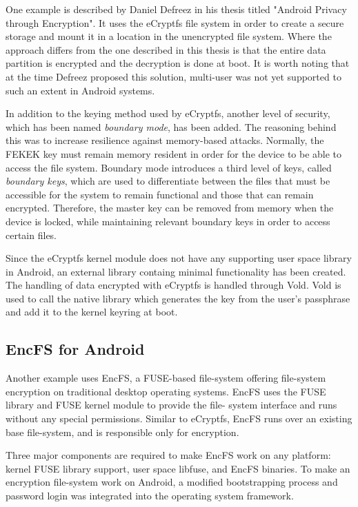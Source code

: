 One example is described by Daniel Defreez in his thesis titled "Android Privacy through Encryption".\cite{defreez}
It uses the eCryptfs file system in order to create a secure storage and mount it in a location in the unencrypted file system. Where the approach differs from the one described in this thesis is that the entire data partition is encrypted and the decryption is done at boot. It is worth noting that at the time Defreez proposed this solution, multi-user was not yet supported to such an extent in Android systems.

In addition to the keying method used by eCryptfs, another level of security, which has been named \textit{boundary mode}, has been added. The reasoning behind this was to increase resilience against memory-based attacks. Normally, the FEKEK key must remain memory resident in order for the device to be able to access the file system. Boundary mode introduces a third level of keys, called \textit{boundary keys}, which are used to differentiate between the files that must be accessible for the system to remain functional and those that can remain encrypted. Therefore, the master key can be removed from memory when the device is locked, while maintaining relevant boundary keys in order to access certain files.

Since the eCryptfs kernel module does not have any supporting user space library in Android, an external library containg minimal functionality has been created. The handling of data encrypted with eCryptfs is handled through Vold. Vold is used to call the native library which generates the key from the user's passphrase and add it to the kernel keyring at boot.

\subsection{EncFS for Android}
\label{sub-sec:encfs-and}

Another example\cite{encfs} uses EncFS, a FUSE-based file-system offering file-system encryption on traditional desktop operating systems. EncFS uses the FUSE library and FUSE kernel module to provide the file- system interface and runs without any special permissions. Similar to eCryptfs, EncFS runs over an existing base file-system, and is responsible only for encryption.

Three major components are required to make EncFS work on any platform: kernel FUSE library support, user space libfuse, and EncFS binaries. To make an encryption file-system work on Android, a modified bootstrapping process and password login was integrated into the operating system framework.

